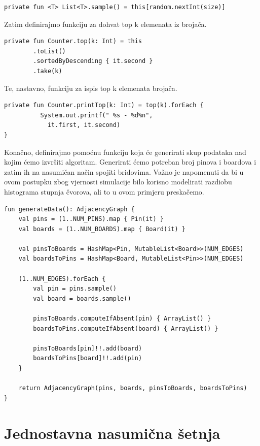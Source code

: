 \documentclass[times, utf8, seminar]{fer}
\begin{document}
\begin{lstlisting}
private fun <T> List<T>.sample() = this[random.nextInt(size)]
\end{lstlisting}

Zatim definirajmo funkciju za dohvat top k elemenata iz brojača.

\begin{lstlisting}
private fun Counter.top(k: Int) = this
        .toList()
        .sortedByDescending { it.second }
        .take(k)
\end{lstlisting}

Te, nastavno, funkciju za ispis top k elemenata brojača.

\begin{lstlisting}
private fun Counter.printTop(k: Int) = top(k).forEach {
		  System.out.printf(" %s - %d%n",
		  	it.first, it.second)
}
\end{lstlisting}

		  Konačno, definirajmo pomoćnu funkciju koja će generirati skup podataka nad kojim ćemo izvršiti algoritam. Generirati ćemo potreban broj pinova i boardova i zatim ih na nasumičan način spojiti bridovima. Važno je napomenuti da bi u ovom postupku zbog vjernosti simulacije bilo korisno modelirati razdiobu histograma stupnja čvorova, ali to u ovom primjeru preskačemo.

\begin{lstlisting}
fun generateData(): AdjacencyGraph {
    val pins = (1..NUM_PINS).map { Pin(it) }
    val boards = (1..NUM_BOARDS).map { Board(it) }

    val pinsToBoards = HashMap<Pin, MutableList<Board>>(NUM_EDGES)
    val boardsToPins = HashMap<Board, MutableList<Pin>>(NUM_EDGES)

    (1..NUM_EDGES).forEach {
        val pin = pins.sample()
        val board = boards.sample()

        pinsToBoards.computeIfAbsent(pin) { ArrayList() }
        boardsToPins.computeIfAbsent(board) { ArrayList() }

        pinsToBoards[pin]!!.add(board)
        boardsToPins[board]!!.add(pin)
    }

    return AdjacencyGraph(pins, boards, pinsToBoards, boardsToPins)
}
\end{lstlisting}

\section{Jednostavna nasumična šetnja}
\end{document}
